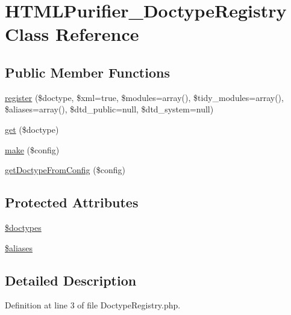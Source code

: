 \hypertarget{classHTMLPurifier__DoctypeRegistry}{\section{H\+T\+M\+L\+Purifier\+\_\+\+Doctype\+Registry Class Reference}
\label{classHTMLPurifier__DoctypeRegistry}
}
\subsection*{Public Member Functions}
\begin{DoxyCompactItemize}
\item 
\hyperlink{classHTMLPurifier__DoctypeRegistry_aef92485f3d409b5eacf62933967f1027}{register} (\$doctype, \$xml=true, \$modules=array(), \$tidy\+\_\+modules=array(), \$aliases=array(), \$dtd\+\_\+public=null, \$dtd\+\_\+system=null)
\item 
\hyperlink{classHTMLPurifier__DoctypeRegistry_ad609a28ab5f280b6955230d81dde1027}{get} (\$doctype)
\item 
\hyperlink{classHTMLPurifier__DoctypeRegistry_a94613f98345e43187f652dfeed3d7fcc}{make} (\$config)
\item 
\hyperlink{classHTMLPurifier__DoctypeRegistry_a2f81739f6047b1a7388b93ab0fd771fe}{get\+Doctype\+From\+Config} (\$config)
\end{DoxyCompactItemize}
\subsection*{Protected Attributes}
\begin{DoxyCompactItemize}
\item 
\hyperlink{classHTMLPurifier__DoctypeRegistry_aadfe9274b5c028c80c51106ba428ce97}{\$doctypes}
\item 
\hyperlink{classHTMLPurifier__DoctypeRegistry_a543ad0ac3f184d26f81a8aa18348be8e}{\$aliases}
\end{DoxyCompactItemize}


\subsection{Detailed Description}


Definition at line 3 of file Doctype\+Registry.\+php.



